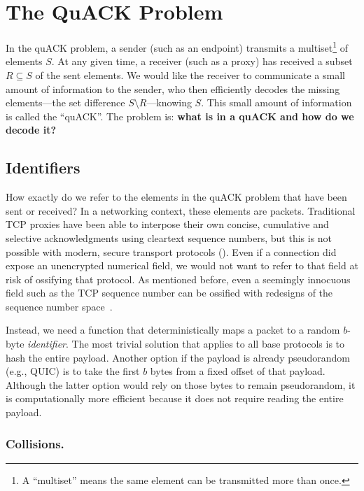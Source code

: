 \section{The QuACK Problem}
\label{sec:quack:problem}

In the quACK problem, a sender (such as an endpoint) transmits a
multiset\footnote{A ``multiset'' means the same element can be transmitted more
than once.} of elements $S$. At any given time, a receiver (such as a proxy)
has received a subset $R \subseteq S$ of the sent elements. We would like the
receiver to communicate a small amount of information to the sender, who then
efficiently decodes the missing elements---the set difference $S \setminus
R$---knowing $S$. This small amount of information is called the ``quACK''. The
problem is: \textbf{what is in a quACK and how do we decode it?}

\subsection{Identifiers}
\label{sec:quack:problem:identifiers}

How exactly do we refer to the elements in the quACK problem that have been sent
or received? In a networking context, these elements are packets. Traditional
TCP proxies have been able to interpose their own concise, cumulative and
selective acknowledgments using cleartext sequence numbers, but this is not
possible with modern, secure transport protocols ().
Even if a connection did expose an unencrypted numerical field, we would not
want to refer to that field at risk of ossifying that protocol. As mentioned
before, even a seemingly innocuous field such as the TCP sequence number can be
ossified with redesigns of the sequence number space~\cite{rfc9000}.

Instead, we need a function that deterministically maps
a packet to a random $b$-byte \emph{identifier}. The most trivial solution
that applies to all base protocols is
to hash the entire payload. Another option if the payload is already
pseudorandom (e.g., QUIC) is to take the first $b$ bytes from a fixed
offset of that payload. Although the latter option would rely on those bytes
to remain pseudorandom, it is computationally more efficient because it
does not require reading the entire payload.

\subsubsection{Collisions.}

